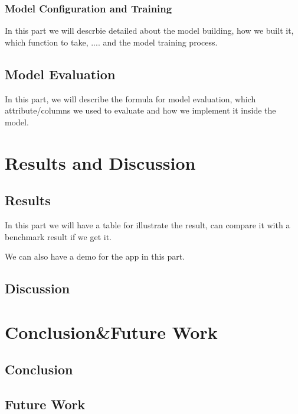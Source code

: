 \documentclass{article}
\begin{document}
\subsubsection{Model Configuration and Training}
In this part we will descrbie detailed about the model building,
how we built it, which function to take, .... and the model training 
process.
\subsection{Model Evaluation}
In this part, we will describe the formula for model evaluation,
which attribute/columns we used to evaluate and how we implement it inside
the model.
\section{Results and Discussion}
\subsection{Results}
In this part we will have a table for illustrate the result,
can compare it with a benchmark result if we get it.

We can also have a demo for the app in this part.

\subsection{Discussion}

\section{Conclusion\&Future Work}
\subsection{Conclusion}
\subsection{Future Work}
\end{document}
